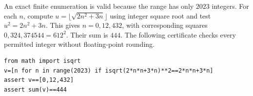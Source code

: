 An exact finite enumeration is valid because the range has only $2023$ integers. For each $n$, compute $u=\lfloor\sqrt{2n^2+3n}\rfloor$ using integer square root and test $u^2=2n^2+3n$. This gives $n=0,12,432$, with corresponding squares $0,324,374544=612^2$. Their sum is $\boxed{444}$. The following certificate checks every permitted integer without floating-point rounding.
\begin{verbatim}
from math import isqrt
v=[n for n in range(2023) if isqrt(2*n*n+3*n)**2==2*n*n+3*n]
assert v==[0,12,432]
assert sum(v)==444
\end{verbatim}
